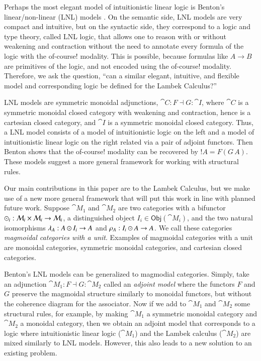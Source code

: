 Perhaps the most elegant model of intuitionistic linear logic is
Benton's linear/non-linear (LNL) models \cite{Benton:1994}. On the
semantic side, LNL models are very compact and intuitive, but on the
syntactic side, they correspond to a logic and type theory, called LNL
logic, that allows one to reason with or without weakening and
contraction without the need to annotate every formula of the logic
with the of-course!  modality.  This is possible, because formulas
like $A \to B$ are primitives of the logic, and not encoded using the
of-course! modality.  Therefore, we ask the question, ``can a similar
elegant, intuitive, and flexible model and corresponding logic be
defined for the Lambek Calculus?''

LNL models are symmetric monoidal adjunctions, $\cat{C} : F \dashv G :
\cat{I}$, where $\cat{C}$ is a symmetric monoidal closed category with
weakening and contraction, hence is a cartesian closed category, and
$\cat{I}$ is a symmetric monoidal closed category.  Thus, a LNL model
consists of a model of intuitionistic logic on the left and a model of
intuitionistic linear logic on the right related via a pair of adjoint
functors.  Then Benton shows that the of-course! modality can be
recovered by $!A = F(G\,A)$.  These models suggest a more general
framework for working with structural rules.

Our main contributions in this paper are to the Lambek Calculus, but
we make use of a new more general framework that will put this work in
line with planned future work.  Suppose $\cat{M}_1$ and $\cat{M}_2$
are two categories with a bifunctor $\odot_i : \mathcal{M}_i \times
\mathcal{M}_i \rightarrow \mathcal{M}_i$, a distinguished object $I_i \in
\mathsf{Obj}(\cat{M}_i)$, and the two natural isomorphisms $\lambda_A
: A \odot I_i \rightarrow A$ and $\rho_A : I_i \odot A \rightarrow A$.  We call
these categories \emph{magmoidal categories with a unit}.  Examples of
magmoidal categories with a unit are monoidal categories, symmetric
monoidal categories, and cartesian closed categories.

Benton's LNL models can be generalized to magmodial categories.
Simply, take an adjunction $\cat{M}_1 : F \dashv G : \cat{M}_2$ called
an \emph{adjoint model} where the functors $F$ and $G$ preserve the
magmoidal structure similarly to monoidal functors, but without the
coherence diagram for the associator.  Now if we add to $\cat{M}_1$
and $\cat{M}_2$ some structural rules, for example, by making
$\cat{M}_1$ a symmetric monoidal category and $\cat{M}_2$ a monoidal
category, then we obtain an adjoint model that corresponds to a logic
where intuitionistic linear logic ($\cat{M}_1$) and the Lambek
calculus ($\cat{M}_2$) are mixed similarly to LNL models.  However,
this also leads to a new solution to an existing problem.


